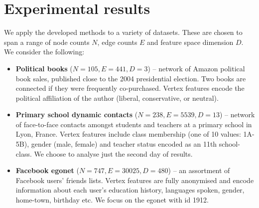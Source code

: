 \section{Experimental results}
\label{sec:experiments}

We apply the developed methods to a variety of datasets. These are chosen to span a range of node counts $N$, edge counts $E$ and feature space dimension $D$. We consider the following:

\begin{itemize}
	\item \textbf{Political books} \cite{polbooks} ($N=105, E=441, D=3$) -- network of Amazon political book sales, published close to the 2004 presidential election. Two books are connected if they were frequently co-purchased. Vertex features encode the political affiliation of the author (liberal, conservative, or neutral).
		
	\item \textbf{Primary school dynamic contacts} \cite{schools} ($N=238, E=5539, D=13$) -- network of face-to-face contacts amongst students and teachers at a primary school in Lyon, France. Vertex features include class membership (one of 10 values: 1A-5B), gender (male, female) and teacher status encoded as an 11th school-class. We choose to analyse just the second day of results.
	
	\item \textbf{Facebook egonet} \cite{fb-snap} ($N=747, E=30025, D=480$) -- an assortment of Facebook users' friends lists. Vertex features are fully anonymised and encode information about each user's education history, languages spoken, gender, home-town, birthday etc. We focus on the egonet with id 1912.

\end{itemize}

